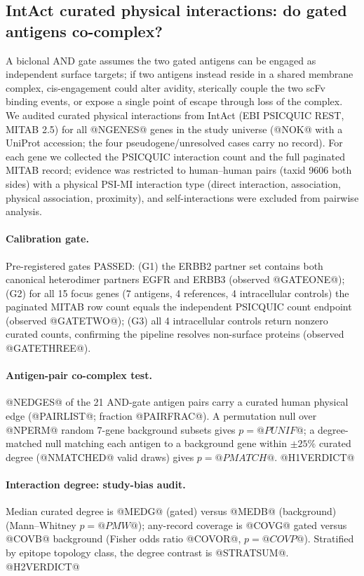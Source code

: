 \subsection{IntAct curated physical interactions: do gated antigens co-complex?}
\label{sec:intact}
A biclonal AND gate assumes the two gated antigens can be engaged as
independent surface targets; if two antigens instead reside in a shared
membrane complex, cis-engagement could alter avidity, sterically couple the
two scFv binding events, or expose a single point of escape through loss of
the complex. We audited curated physical interactions from IntAct (EBI
PSICQUIC REST, MITAB 2.5) for all @NGENES@ genes in the study universe
(@NOK@ with a UniProt accession; the four pseudogene/unresolved cases carry
no record). For each gene we collected the PSICQUIC interaction count and
the full paginated MITAB record; evidence was restricted to human--human
pairs (taxid 9606 both sides) with a physical PSI-MI interaction type
(direct interaction, association, physical association, proximity), and
self-interactions were excluded from pairwise analysis.

\paragraph{Calibration gate.} Pre-registered gates PASSED: (G1) the ERBB2
partner set contains both canonical heterodimer partners EGFR and ERBB3
(observed @GATEONE@); (G2) for all 15 focus genes (7 antigens, 4 references,
4 intracellular controls) the paginated MITAB row count equals the
independent PSICQUIC count endpoint (observed @GATETWO@); (G3) all 4
intracellular controls return nonzero curated counts, confirming the
pipeline resolves non-surface proteins (observed @GATETHREE@).

\paragraph{Antigen-pair co-complex test.} @NEDGES@ of the 21 AND-gate
antigen pairs carry a curated human physical edge (@PAIRLIST@; fraction
@PAIRFRAC@). A permutation null over @NPERM@ random 7-gene background
subsets gives $p=@PUNIF@$; a degree-matched null matching each antigen to a
background gene within $\pm25\%$ curated degree (@NMATCHED@ valid draws)
gives $p=@PMATCH@$. @H1VERDICT@

\paragraph{Interaction degree: study-bias audit.} Median curated degree is
@MEDG@ (gated) versus @MEDB@ (background) (Mann--Whitney $p=@PMW@$);
any-record coverage is @COVG@ gated versus @COVB@ background (Fisher odds
ratio @COVOR@, $p=@COVP@$). Stratified by epitope topology class, the
degree contrast is @STRATSUM@. @H2VERDICT@

